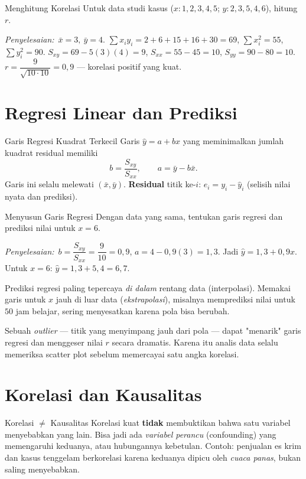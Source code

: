 \documentclass[11pt,a4paper]{report}
\theoremstyle{gaya}
\newcommand{\jawab}{\par\smallskip\noindent\textit{\textcolor{oranye}{Penyelesaian:}}\ }
\begin{document}
\begin{contoh}{Menghitung Korelasi}
Untuk data studi kasus ($x:1,2,3,4,5$; $y:2,3,5,4,6$), hitung $r$.

\jawab $\bar x=3,\ \bar y=4$. $\sum x_iy_i=2+6+15+16+30=69$, $\sum x_i^2=55$, $\sum y_i^2=90$.
$S_{xy}=69-5(3)(4)=9$, $S_{xx}=55-45=10$, $S_{yy}=90-80=10$.
$r=\dfrac{9}{\sqrt{10\cdot10}}=0{,}9$ --- korelasi positif yang kuat.
\end{contoh}

\section{Regresi Linear dan Prediksi}
\begin{konsep}{Garis Regresi Kuadrat Terkecil}
Garis $\hat y=a+bx$ yang meminimalkan jumlah kuadrat residual memiliki
\[
b=\frac{S_{xy}}{S_{xx}},\qquad a=\bar y-b\bar x.
\]
Garis ini selalu melewati $(\bar x,\bar y)$. \textbf{Residual} titik ke-$i$: $e_i=y_i-\hat y_i$ (selisih nilai nyata dan prediksi).
\end{konsep}

\begin{contoh}{Menyusun Garis Regresi}
Dengan data yang sama, tentukan garis regresi dan prediksi nilai untuk $x=6$.

\jawab $b=\dfrac{S_{xy}}{S_{xx}}=\dfrac{9}{10}=0{,}9$, $a=4-0{,}9(3)=1{,}3$.
Jadi $\hat y=1{,}3+0{,}9x$. Untuk $x=6$: $\hat y=1{,}3+5{,}4=6{,}7$.
\end{contoh}

\begin{kesalahan}
Prediksi regresi paling tepercaya \emph{di dalam} rentang data (interpolasi). Memakai garis untuk $x$ jauh di luar data (\emph{ekstrapolasi}), misalnya memprediksi nilai untuk $50$ jam belajar, sering menyesatkan karena pola bisa berubah.
\end{kesalahan}

\begin{dunianyata}
Sebuah \emph{outlier} --- titik yang menyimpang jauh dari pola --- dapat "menarik" garis regresi dan menggeser nilai $r$ secara dramatis. Karena itu analis data selalu memeriksa scatter plot sebelum memercayai satu angka korelasi.
\end{dunianyata}

\section{Korelasi dan Kausalitas}
\begin{konsep}{Korelasi $\neq$ Kausalitas}
Korelasi kuat \textbf{tidak} membuktikan bahwa satu variabel menyebabkan yang lain. Bisa jadi ada \emph{variabel perancu} (confounding) yang memengaruhi keduanya, atau hubungannya kebetulan. Contoh: penjualan es krim dan kasus tenggelam berkorelasi karena keduanya dipicu oleh \emph{cuaca panas}, bukan saling menyebabkan.
\end{konsep}
\end{document}
